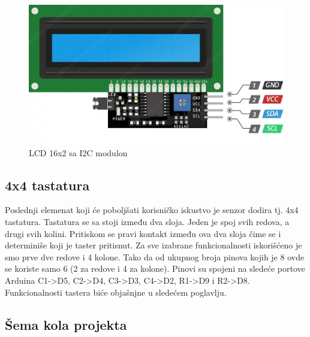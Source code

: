 \documentclass[a4paper, 12pt]{article}
\begin{document}
	\begin{figure}[H]
\centering
\includegraphics[scale=0.6]{images/I2CLCD}
\caption{LCD 16x2 sa I2C modulon} \label{fig:I2CLCD}
\end{figure}
	


	\subsection{4x4 tastatura}
	
	Poslednji elemenat koji će poboljšati korisničko iskustvo je senzor dodira tj. 4x4 tastatura. Tastatura se sa stoji između dva sloja. Jeden je spoj svih redova, a drugi svih kolini. Pritiskom se pravi kontakt između ova dva sloja čime se i determiniše koji je taster pritisnut. Za sve izabrane funkcionalnosti iskorišćeno je smo prve dve redove i 4 kolone. Tako da od ukupnog broja pinova kojih je 8 ovde se koriste samo 6 (2 za redove i 4 za kolone). Pinovi su spojeni na sledeće portove Arduina C1->D5, C2->D4, C3->D3, C4->D2, R1->D9 i R2->D8. Funkcionalnosti tastera biće objašnjne u sledećem poglavlju.
	
\pagebreak

	\subsection*{Šema kola projekta}
	
\begin{figure}[H]
\centering
{} 
\label{fig:circuit_diagram}
\end{figure}
\end{document}

